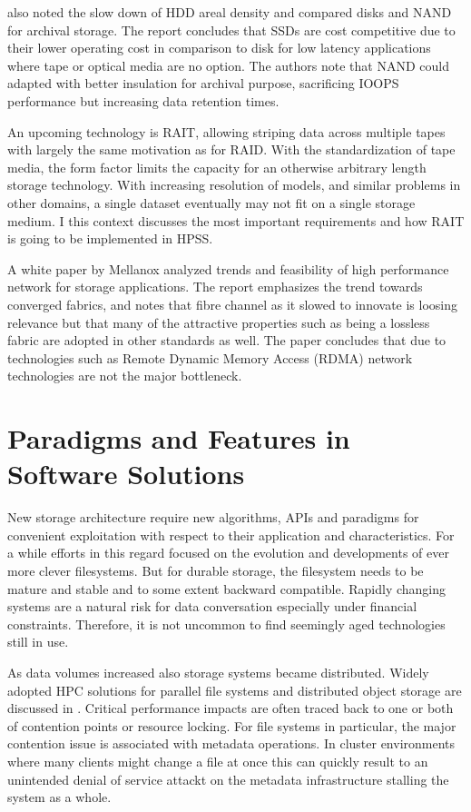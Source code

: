 \cite{gupta_economic_2014} also noted the slow down of HDD areal density and compared disks and NAND for archival storage.
The report concludes that SSDs are cost competitive due to their lower operating cost in comparison to disk for low latency applications where tape or optical media are no option.
The authors note that NAND could adapted with better insulation for archival purpose, sacrificing IOOPS performance but increasing data retention times.

An upcoming technology is RAIT, allowing striping data across multiple tapes with
largely the same motivation as for RAID. With the standardization of tape media,
the form factor limits the capacity for an otherwise arbitrary length storage
technology. With increasing resolution of models, and similar problems in other
domains, a single dataset eventually may not fit on a single storage medium. I
this context \cite{hughes_hpss_2009} discusses the most important requirements
and how RAIT is going to be implemented in HPSS.


A white paper by Mellanox \cite{mellanox_building_2012} analyzed trends and
feasibility of high performance network for storage applications. The report
emphasizes the trend towards converged fabrics, and notes that fibre channel as
it slowed to innovate is loosing relevance but that many of the attractive
properties such as being a lossless fabric are adopted in other standards as
well. The paper concludes that due to technologies such as Remote Dynamic Memory
Access (RDMA) network technologies are not the major bottleneck.

\section{Paradigms and Features in Software Solutions}

New storage architecture require new algorithms, APIs and paradigms for convenient exploitation with respect to their application and characteristics.
For a while efforts in this regard focused on the evolution and developments of ever more clever filesystems.
But for durable storage, the filesystem needs to be mature and stable and to some extent backward compatible.
Rapidly changing systems are a natural risk for data conversation especially under financial constraints.
Therefore, it is not uncommon to find seemingly aged technologies still in use.

As data volumes increased also storage systems became distributed. Widely adopted
HPC solutions for parallel file systems and distributed object storage are
discussed in . Critical performance
impacts are often traced back to one or both of contention points or resource
locking.  For file systems in particular, the major contention issue is
associated with metadata operations. In cluster environments where many clients
might change a file at once this can quickly result to an unintended denial of
service attackt on the metadata infrastructure stalling the system as a whole.

